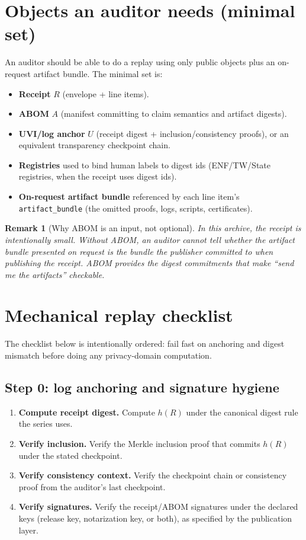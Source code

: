 \documentclass[11pt]{article}
\newtheorem{remark}{Remark}
\begin{document}
\section{Objects an auditor needs (minimal set)}
An auditor should be able to do a replay using only public objects plus an on-request artifact bundle.
The minimal set is:
\begin{itemize}[leftmargin=*]
\item \textbf{Receipt} $R$ (envelope + line items).\cite{series:receiptitems}
\item \textbf{ABOM} $A$ (manifest committing to claim semantics and artifact digests).\cite{series:abomoinl}
\item \textbf{UVI/log anchor} $U$ (receipt digest + inclusion/consistency proofs), or an equivalent transparency checkpoint chain.\cite{series:transparencyprimitives}
\item \textbf{Registries} used to bind human labels to digest ids (ENF/TW/State registries, when the receipt uses digest ids).
\item \textbf{On-request artifact bundle} referenced by each line item's \texttt{artifact\_bundle} (the omitted proofs, logs, scripts, certificates).
\end{itemize}

\begin{remark}[Why ABOM is an input, not optional]
In this archive, the receipt is intentionally small.
Without ABOM, an auditor cannot tell whether the artifact bundle presented on request is \emph{the} bundle the publisher committed to when publishing the receipt.
ABOM provides the digest commitments that make ``send me the artifacts'' checkable.\cite{series:abomoinl}
\end{remark}

\section{Mechanical replay checklist}\label{sec:checklist}
The checklist below is intentionally ordered: fail fast on anchoring and digest mismatch before doing any privacy-domain computation.

\subsection{Step 0: log anchoring and signature hygiene}
\begin{enumerate}[leftmargin=*]
\item \textbf{Compute receipt digest.} Compute $h(R)$ under the canonical digest rule the series uses.
\item \textbf{Verify inclusion.} Verify the Merkle inclusion proof that commits $h(R)$ under the stated checkpoint.\cite{series:transparencyprimitives}
\item \textbf{Verify consistency context.} Verify the checkpoint chain or consistency proof from the auditor's last checkpoint.\cite{series:transparencyprimitives}
\item \textbf{Verify signatures.} Verify the receipt/ABOM signatures under the declared keys (release key, notarization key, or both), as specified by the publication layer.\cite{series:abomoinl}
\end{enumerate}
\end{document}
